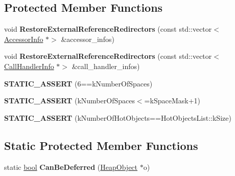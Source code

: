 \subsection*{Protected Member Functions}
\begin{DoxyCompactItemize}
\item 
\mbox{\label{classv8_1_1internal_1_1SerializerDeserializer_a5c91b3e930035c91deef367d017e47cc}} 
void {\bfseries Restore\+External\+Reference\+Redirectors} (const std\+::vector$<$ \mbox{\hyperlink{classv8_1_1internal_1_1AccessorInfo}{Accessor\+Info}} $\ast$$>$ \&accessor\+\_\+infos)
\item 
\mbox{\label{classv8_1_1internal_1_1SerializerDeserializer_a0b43c343a30f7fe926083dbc61c45933}} 
void {\bfseries Restore\+External\+Reference\+Redirectors} (const std\+::vector$<$ \mbox{\hyperlink{classv8_1_1internal_1_1CallHandlerInfo}{Call\+Handler\+Info}} $\ast$$>$ \&call\+\_\+handler\+\_\+infos)
\item 
\mbox{\label{classv8_1_1internal_1_1SerializerDeserializer_ab6ad0bdcbcb29295f395be5f50addcc7}} 
{\bfseries S\+T\+A\+T\+I\+C\+\_\+\+A\+S\+S\+E\+RT} (6==k\+Number\+Of\+Spaces)
\item 
\mbox{\label{classv8_1_1internal_1_1SerializerDeserializer_a3efd56038139e6f57289165962d7c9d5}} 
{\bfseries S\+T\+A\+T\+I\+C\+\_\+\+A\+S\+S\+E\+RT} (k\+Number\+Of\+Spaces$<$=k\+Space\+Mask+1)
\item 
\mbox{\label{classv8_1_1internal_1_1SerializerDeserializer_af8a2d59f3f3b5774a7f0d1fa25473586}} 
{\bfseries S\+T\+A\+T\+I\+C\+\_\+\+A\+S\+S\+E\+RT} (k\+Number\+Of\+Hot\+Objects==Hot\+Objects\+List\+::k\+Size)
\end{DoxyCompactItemize}
\subsection*{Static Protected Member Functions}
\begin{DoxyCompactItemize}
\item 
\mbox{\label{classv8_1_1internal_1_1SerializerDeserializer_a65ec23ada9d043a0063d40b1f9cd37e6}} 
static \mbox{\hyperlink{classbool}{bool}} {\bfseries Can\+Be\+Deferred} (\mbox{\hyperlink{classv8_1_1internal_1_1HeapObject}{Heap\+Object}} $\ast$o)
\end{DoxyCompactItemize}

